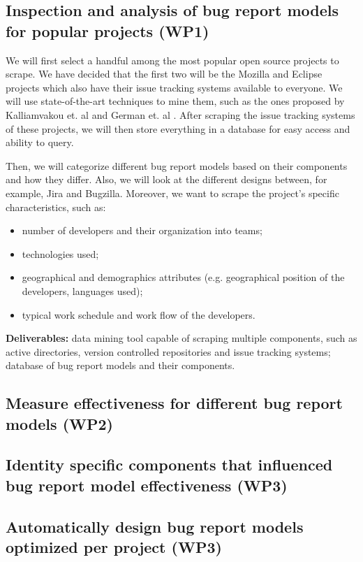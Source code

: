 \documentclass[11pt,english,twocolumn]{article}
\begin{document}
\subsection*{Inspection and analysis of bug report models for popular projects (WP1)}

We will first select a handful among the most popular open source projects to scrape.
We have decided that the first two will be the Mozilla and Eclipse projects which also have
their issue tracking systems available to everyone. We will use state-of-the-art techniques
to mine them, such as the ones proposed by Kalliamvakou et. al \cite{kalliamvakou2014promises} 
and German et. al \cite{german2016continuously}. After scraping the issue tracking systems
of these projects, we will then store everything in a database for easy access and ability
to query. 

Then, we will categorize different bug report models based on their components and how
they differ. Also, we will look at the different designs between, for example, Jira and Bugzilla.
Moreover, we want to scrape the project's specific characteristics, such as:
	\begin{itemize}
		\item number of developers and their organization into teams;
		\item technologies used;
		\item geographical and demographics attributes (e.g. geographical position of the 
		developers, languages used);
		\item typical work schedule and work flow of the developers.
	\end{itemize}
\textbf{Deliverables:} data mining tool capable of scraping multiple components, such as 
active directories, version controlled repositories and issue tracking systems; database of
bug report models and their components.

\subsection*{Measure effectiveness for different bug report models (WP2)}

\subsection*{Identity specific components that influenced bug report model effectiveness (WP3)}

\subsection*{Automatically design bug report models optimized per project (WP3)}
\end{document}
